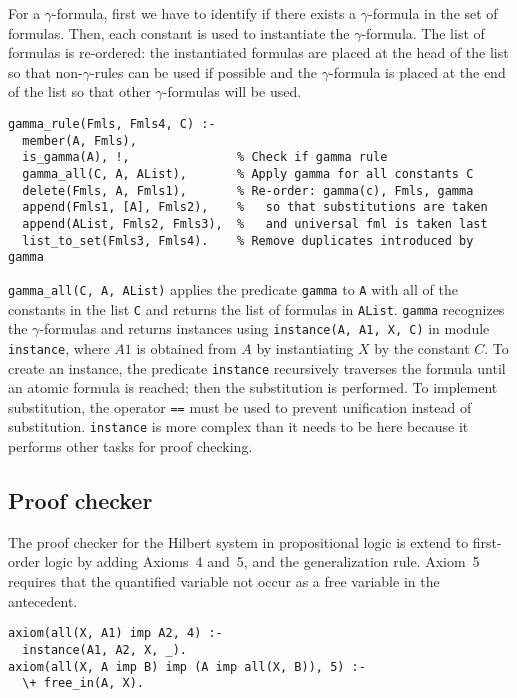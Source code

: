 \documentclass[11pt]{article}
\newcommand*{\p}[1]{\textup{\texttt{#1}}}
\begin{document}
For a $\gamma$-formula, first we have to identify if there exists a
$\gamma$-formula in the set of formulas. Then, each constant is used to
instantiate the $\gamma$-formula. The list of formulas is re-ordered:
the instantiated formulas are placed at the head of the list so that
non-$\gamma$-rules can be used if possible and the $\gamma$-formula is
placed at the end of the list so that other $\gamma$-formulas will be
used.

\begin{verbatim}
gamma_rule(Fmls, Fmls4, C) :-
  member(A, Fmls),
  is_gamma(A), !,               % Check if gamma rule
  gamma_all(C, A, AList),       % Apply gamma for all constants C
  delete(Fmls, A, Fmls1),       % Re-order: gamma(c), Fmls, gamma
  append(Fmls1, [A], Fmls2),    %   so that substitutions are taken
  append(AList, Fmls2, Fmls3),  %   and universal fml is taken last
  list_to_set(Fmls3, Fmls4).    % Remove duplicates introduced by gamma
\end{verbatim}

\p{gamma\_all(C, A, AList)} applies the predicate \p{gamma} to \p{A}
with all of the constants in the list \p{C} and returns the list of
formulas in \p{AList}. \p{gamma} recognizes the $\gamma$-formulas and
returns instances using \p{instance(A, A1, X, C)} in module
\p{instance}, where $A1$ is obtained from $A$ by instantiating $X$ by
the constant $C$. To create an instance, the predicate \p{instance}
recursively traverses the formula until an atomic formula is reached;
then the substitution is performed. To implement substitution, the
operator \p{==} must be used to prevent unification instead of
substitution. \p{instance} is more complex than it needs to be here
because it performs other tasks for proof checking.



\subsection{Proof checker}\label{s.checkfol}

The proof checker for the Hilbert system in propositional logic is
extend to first-order logic by adding Axioms~4 and~5, and the
generalization rule. Axiom~5 requires that the quantified variable not
occur as a free variable in the antecedent.

\begin{verbatim}
axiom(all(X, A1) imp A2, 4) :-
  instance(A1, A2, X, _).
axiom(all(X, A imp B) imp (A imp all(X, B)), 5) :-
  \+ free_in(A, X).
\end{verbatim}
\end{document}
